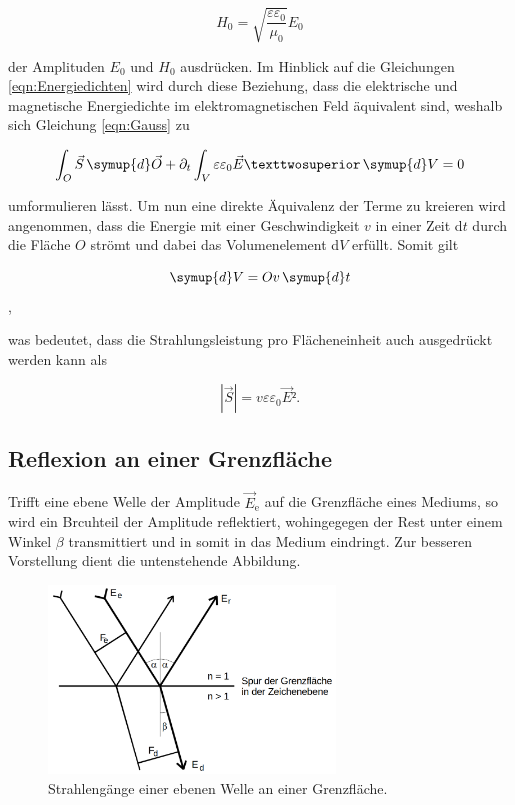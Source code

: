 \begin{equation}
    H_0 = \sqrt{\frac{\varepsilon\varepsilon_0}{\mu_0}}E_0
\label{eqn:Amplituden}
\end{equation}

\noindent der Amplituden $E_0$ und $H_0$ ausdrücken. Im Hinblick auf die Gleichungen \eqref{eqn:Energiedichten} wird durch diese Beziehung, dass die elektrische und magnetische 
Energiedichte im elektromagnetischen Feld äquivalent sind, weshalb sich Gleichung \eqref{eqn:Gauss} zu

\begin{equation*}
    \int_O \vec{S}\,\symup{d}\vec{O} +\partial_t\int_V \varepsilon\varepsilon_0\vec{E}²\,\symup{d}V = 0
\end{equation*}

\noindent umformulieren lässt. Um nun eine direkte Äquivalenz der Terme zu kreieren wird angenommen, dass die Energie mit einer Geschwindigkeit $v$ in einer Zeit d$t$ 
durch die Fläche $O$ strömt und dabei das Volumenelement d$V$ erfüllt. Somit gilt

\begin{equation*}
    \symup{d}V = Ov\,\symup{d}t 
\end{equation*},

\noindent was bedeutet, dass die Strahlungsleistung pro Flächeneinheit auch ausgedrückt werden kann als 

\begin{equation}
    |\vec{S}| = v\varepsilon\varepsilon_0\vec{E}².
\label{eqn:BetragS}
\end{equation}

\subsection{Reflexion an einer Grenzfläche}
\label{sec:Grenzflaeche}

Trifft eine ebene Welle der Amplitude $\vec{E}_\text{e}$ auf die Grenzfläche eines Mediums, so wird ein Brcuhteil der Amplitude reflektiert, wohingegegen der Rest unter einem 
Winkel $\beta$ transmittiert und in somit in das Medium eindringt. Zur besseren Vorstellung dient die untenstehende Abbildung.

\begin{figure}[H]
    \centering
    \includegraphics[height=5cm]{content/Grenzflaeche.png}
    \caption{Strahlengänge einer ebenen Welle an einer Grenzfläche\cite{Versuchsanleitung_v407}.}
    \label{fig:SkizzeGrenzflaeche}
\end{figure}

